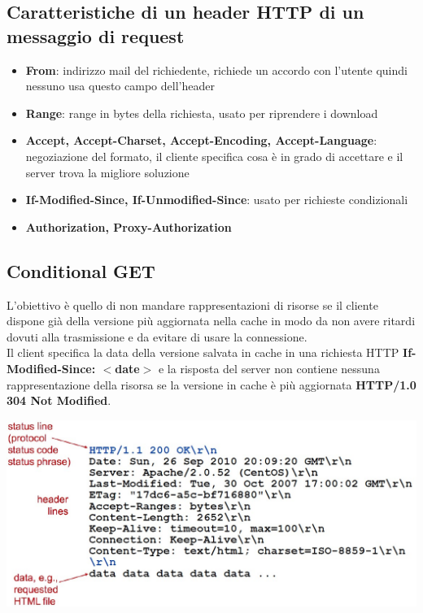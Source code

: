 \subsection{Caratteristiche di un header HTTP di un messaggio di request}
\begin{itemize}
    \item \textbf{From}: indirizzo mail del richiedente, richiede un accordo con l'utente quindi nessuno usa questo campo dell'header
    \item \textbf{Range}: range in bytes della richiesta, usato per riprendere i download
    \item \textbf{Accept, Accept-Charset, Accept-Encoding, Accept-Language}: negoziazione del formato, il cliente specifica cosa è in grado di accettare e il server trova la migliore soluzione
    \item \textbf{If-Modified-Since, If-Unmodified-Since}: usato per richieste condizionali
    \item \textbf{Authorization, Proxy-Authorization}
\end{itemize}

\subsection{Conditional GET}
L'obiettivo è quello di non mandare rappresentazioni di risorse se il cliente dispone già della versione più aggiornata nella cache in modo da non avere ritardi dovuti alla trasmissione e da evitare di usare la connessione. \\ 
Il client specifica la data della versione salvata in cache in una richiesta HTTP \textbf{If-Modified-Since: $<$date$>$} e la risposta del server non contiene nessuna rappresentazione della risorsa se la versione in cache è più aggiornata \textbf{HTTP/1.0 304 Not Modified}.

\begin{center}
\includegraphics[scale=0.4]{Images/TecnologieWeb/1/MessaggioRispostaHTTP.jpg}    
\end{center}

